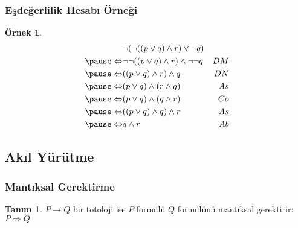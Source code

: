 \documentclass[dvipsnames]{beamer}
\theoremstyle{definition}
\newtheorem{tanim}[theorem]{Tanım}
\theoremstyle{example}
\newtheorem{ornek}[theorem]{Örnek}
\theoremstyle{plain}
\begin{document}
\begin{frame}
  \frametitle{Eşdeğerlilik Hesabı Örneği}

  \begin{ornek}
    \begin{eqnarray*}
                      & \neg (\neg ((p \vee q) \wedge r) \vee \neg q)      &\\
      \pause
      \Leftrightarrow & \neg \neg ((p \vee q) \wedge r) \wedge \neg \neg q & DM\\
      \pause
      \Leftrightarrow & ((p \vee q) \wedge r) \wedge q                     & DN\\
      \pause
      \Leftrightarrow & (p \vee q) \wedge (r \wedge q)                     & As\\
      \pause
      \Leftrightarrow & (p \vee q) \wedge (q \wedge r)                     & Co\\
      \pause
      \Leftrightarrow & ((p \vee q) \wedge q) \wedge r                     & As\\
      \pause
      \Leftrightarrow & q \wedge r                                         & Ab
    \end{eqnarray*}
  \end{ornek}
\end{frame}

\subsection{Akıl Yürütme}

\begin{frame}
  \frametitle{Mantıksal Gerektirme}

  \begin{tanim}
    $P \rightarrow Q$ bir totoloji ise $P$ formülü $Q$ formülünü
    \alert{mantıksal gerektirir}:\\
    $P \Rightarrow Q$
  \end{tanim}
\end{frame}
\end{document}
